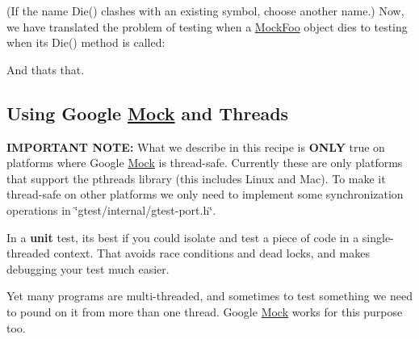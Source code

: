 \begin{DoxyCode}{0}
\DoxyCodeLine{\};}
\end{DoxyCode}


(If the name {\ttfamily Die()} clashes with an existing symbol, choose another name.) Now, we have translated the problem of testing when a {\ttfamily \mbox{\hyperlink{classMockFoo}{Mock\+Foo}}} object dies to testing when its {\ttfamily Die()} method is called\+:


\begin{DoxyCode}{0}
\DoxyCodeLine{\{}
\DoxyCodeLine{}
\DoxyCodeLine{\}}
\end{DoxyCode}


And that\textquotesingle{}s that.

\subsection*{Using Google \mbox{\hyperlink{classMock}{Mock}} and Threads}

{\bfseries{I\+M\+P\+O\+R\+T\+A\+NT N\+O\+TE\+:}} What we describe in this recipe is {\bfseries{O\+N\+LY}} true on platforms where Google \mbox{\hyperlink{classMock}{Mock}} is thread-\/safe. Currently these are only platforms that support the pthreads library (this includes Linux and Mac). To make it thread-\/safe on other platforms we only need to implement some synchronization operations in {\ttfamily \char`\"{}gtest/internal/gtest-\/port.\+h\char`\"{}}.

In a {\bfseries{unit}} test, it\textquotesingle{}s best if you could isolate and test a piece of code in a single-\/threaded context. That avoids race conditions and dead locks, and makes debugging your test much easier.

Yet many programs are multi-\/threaded, and sometimes to test something we need to pound on it from more than one thread. Google \mbox{\hyperlink{classMock}{Mock}} works for this purpose too.

